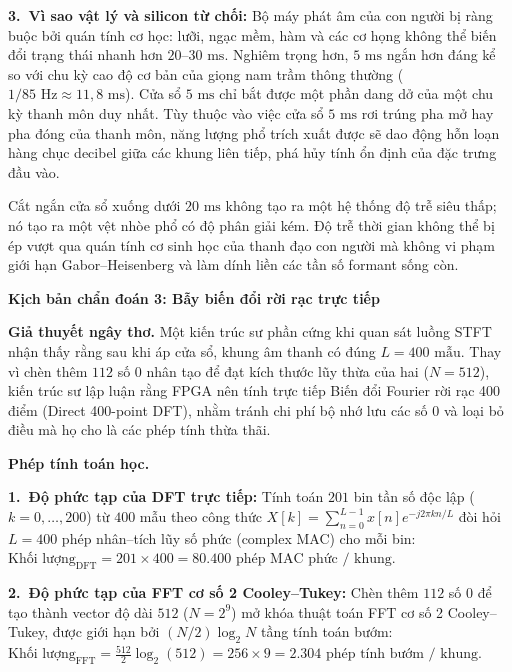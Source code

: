 \documentclass[11pt,a4paper]{article}
\newcommand{\diagsec}[1]{\vspace{1.6pt}\textbf{\large #1}\vspace{0.5pt}\par}
\begin{document}
\textbf{3.~Vì sao vật lý và silicon từ chối:} Bộ máy phát âm của con người bị ràng buộc bởi quán tính cơ học: lưỡi, ngạc mềm, hàm và các cơ họng không thể biến đổi trạng thái nhanh hơn $20\text{--}30\text{ ms}$. Nghiêm trọng hơn, $5\text{ ms}$ ngắn hơn đáng kể so với chu kỳ cao độ cơ bản của giọng nam trầm thông thường ($1 / 85\text{ Hz} \approx 11{,}8\text{ ms}$). Cửa sổ $5\text{ ms}$ chỉ bắt được một phần dang dở của một chu kỳ thanh môn duy nhất. Tùy thuộc vào việc cửa sổ $5\text{ ms}$ rơi trúng pha mở hay pha đóng của thanh môn, năng lượng phổ trích xuất được sẽ dao động hỗn loạn hàng chục decibel giữa các khung liên tiếp, phá hủy tính ổn định của đặc trưng đầu vào.

\begin{physicalinsight}
Cắt ngắn cửa sổ xuống dưới $20\text{ ms}$ không tạo ra một hệ thống độ trễ siêu thấp; nó tạo ra một vệt nhòe phổ có độ phân giải kém. Độ trễ thời gian không thể bị ép vượt qua quán tính cơ sinh học của thanh đạo con người mà không vi phạm giới hạn Gabor--Heisenberg và làm dính liền các tần số formant sống còn.
\end{physicalinsight}

\diagsec{Kịch bản chẩn đoán 3: Bẫy biến đổi rời rạc trực tiếp}

\textbf{Giả thuyết ngây thơ.} Một kiến trúc sư phần cứng khi quan sát luồng STFT nhận thấy rằng sau khi áp cửa sổ, khung âm thanh có đúng $L = 400\text{ mẫu}$. Thay vì chèn thêm $112$ số 0 nhân tạo để đạt kích thước lũy thừa của hai ($N = 512$), kiến trúc sư lập luận rằng FPGA nên tính trực tiếp Biến đổi Fourier rời rạc 400 điểm (Direct 400-point DFT), nhằm tránh chi phí bộ nhớ lưu các số 0 và loại bỏ điều mà họ cho là các phép tính thừa thãi.

\textbf{Phép tính toán học.}

\textbf{1.~Độ phức tạp của DFT trực tiếp:} Tính toán $201$ bin tần số độc lập ($k = 0, \dots, 200$) từ $400$ mẫu theo công thức $X[k] = \sum_{n=0}^{L-1} x[n] e^{-j 2\pi k n / L}$ đòi hỏi $L = 400$ phép nhân--tích lũy số phức (complex MAC) cho mỗi bin:
$\text{Khối lượng}_{\text{DFT}} = 201 \times 400 = 80{.}400\text{ phép MAC phức / khung}$.

\textbf{2.~Độ phức tạp của FFT cơ số 2 Cooley--Tukey:} Chèn thêm $112$ số 0 để tạo thành vector độ dài $512$ ($N = 2^9$) mở khóa thuật toán FFT cơ số 2 Cooley--Tukey, được giới hạn bởi $(N/2) \log_2 N$ tầng tính toán bướm:
$\text{Khối lượng}_{\text{FFT}} = \frac{512}{2} \log_2(512) = 256 \times 9 = 2{.}304\text{ phép tính bướm / khung}$.
\end{document}
